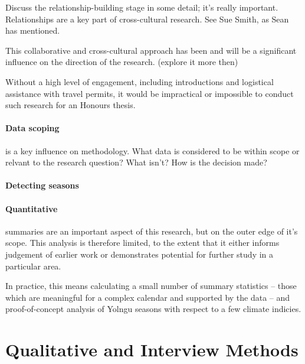 
Discuss the relationship-building stage in some detail; it's really important.
Relationships are a key part of cross-cultural research.  See Sue Smith, as
Sean has mentioned.

This collaborative and cross-cultural approach has been and will be a
significant influence on the direction of the research. (explore it more then)

Without a high level of engagement, including introductions and logistical
assistance with travel permits, it would be impractical or impossible to
conduct such research for an Honours thesis.




\paragraph{Data scoping} is a key influence on methodology.  What data is
considered to be within scope or relvant to the research question?
What isn't?  How is the decision made?



\paragraph{Detecting seasons} 



\paragraph{Quantitative} summaries are an important aspect of this
research, but on the outer edge of it's scope.  This analysis is therefore
limited, to the extent that it either informs judgement of earlier work
or demonstrates potential for further study in a particular area.

In practice, this means calculating a small number of summary statistics
-- those which are meaningful for a complex calendar and supported by the
data -- and proof-of-concept analysis of Yolngu seasons with respect to
a few climate indicies.



\section{Qualitative and Interview Methods}


